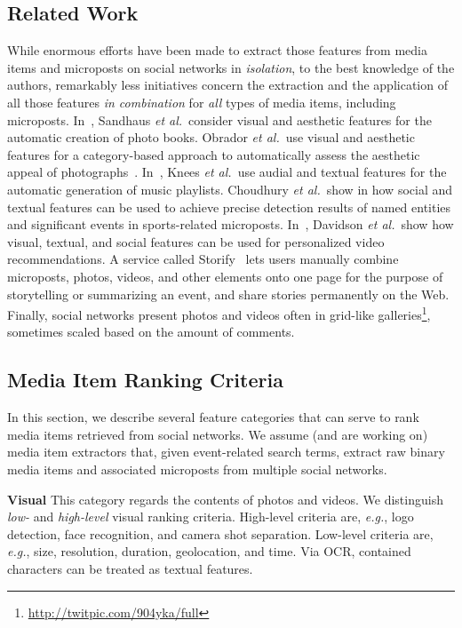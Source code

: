 \subsection{Related Work}
While enormous efforts have been made to extract those features
from media items and microposts on social networks in \emph{isolation},
to the best knowledge of the authors, remarkably less initiatives 
concern the extraction and the application
of all those features \emph{in combination}
for \emph{all} types of media items, including microposts.
In~\cite{Photo2011}, Sandhaus \emph{et al.}\ consider visual and
aesthetic features for the automatic creation of photo books.
Obrador \emph{et al.}\ use visual and aesthetic features
for a category-based approach to automatically assess
the aesthetic appeal of photographs~\cite{Photo2012}.
In~\cite{Playlist2006}, Knees \emph{et al.}\ use audial and textual
features for the automatic generation of music playlists.
Choudhury \emph{et al.}\ show in\cite{Sports2011} how social and textual
features can be used to achieve precise detection results 
of named entities and significant events in sports-related microposts.
In~\cite{YouTube2010}, Davidson \emph{et al.}\ show how visual,
textual, and social features can be used for personalized video recommendations.
A service called Storify~\cite{Storify2011} lets users manually combine
microposts, photos, videos, and other elements onto one page for the purpose
of storytelling or summarizing an event,
and share stories permanently on the Web.
Finally, social networks present photos and videos
often in grid-like galleries\footnote{\url{http://twitpic.com/904yka/full}}, sometimes scaled
based on the amount of comments.

\subsection{Media Item Ranking Criteria}
In this section, we describe several feature categories that can serve to rank
media items retrieved from social networks. 
We assume (and are working on) media item extractors that,
given event-related search terms,
extract raw binary media items and associated microposts
from multiple social networks.

\noindent \textbf{Visual}
This category regards the contents of photos and videos.
We distinguish \emph{low-} and \emph{high-level} visual ranking criteria.
High-level criteria are, \emph{e.g.}, logo detection,
face recognition, and camera shot separation.
Low-level criteria are, \emph{e.g.}, size, resolution,
duration, geolocation, and time.
Via OCR, contained characters can be treated as textual features.


